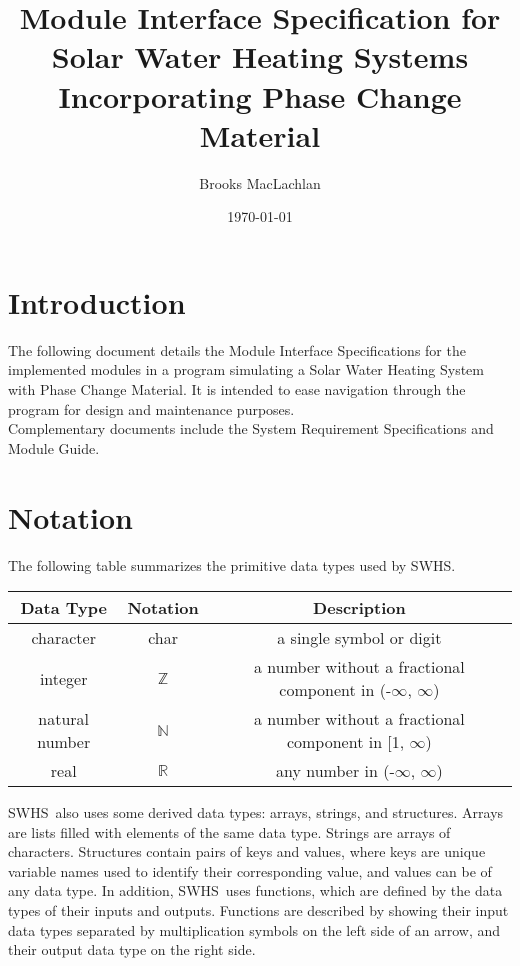 \documentclass[12pt]{article}
\newcommand{\progname}{SWHS}
\begin{document}
\title{Module Interface Specification for Solar Water Heating Systems Incorporating Phase Change Material}
\author{Brooks MacLachlan}
\date{\today}

\maketitle

\tableofcontents

\section{Introduction}

The following document details the Module Interface Specifications for the implemented 
modules in a program simulating a Solar Water Heating System with Phase Change Material.
It is intended to ease navigation through the program for design and maintenance purposes.\\
Complementary documents include the System Requirement Specifications and Module Guide. 

\section{Notation}

The following table summarizes the primitive data types used by \progname. 

\begin{center}
\renewcommand{\arraystretch}{1.2}
\noindent 
\begin{tabular}{c c c} 
\toprule 
\textbf{Data Type} & \textbf{Notation} & \textbf{Description}\\ 
\midrule
character & char & a single symbol or digit\\
integer & $\mathbb{Z}$ & a number without a fractional component in (-$\infty$, $\infty$) \\
natural number & $\mathbb{N}$ & a number without a fractional component in [1, $\infty$) \\
real & $\mathbb{R}$ & any number in (-$\infty$, $\infty$)\\
\bottomrule
\end{tabular} 
\end{center}

\noindent
\progname \ also uses some derived data types: arrays, strings, and structures. Arrays are lists filled with elements of the same data type. Strings are arrays of characters. Structures contain pairs of keys and values, where keys are unique variable names used to identify their corresponding value, and values can be of any data type. In addition,  \progname \ uses functions, which are defined by the data types of their inputs and outputs. Functions are described by showing their input data types separated by multiplication symbols on the left side of an arrow, and their output data type on the right side.
\end{document}
